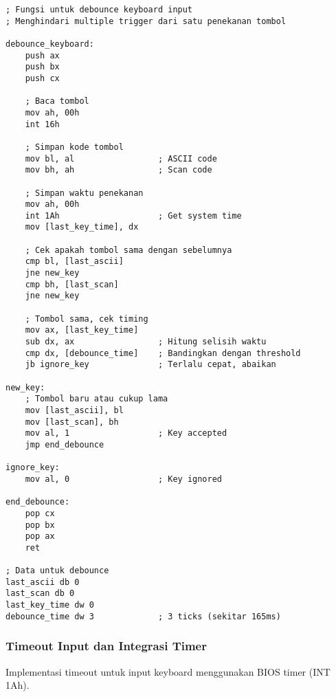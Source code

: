\documentclass[../main.tex]{subfiles}
\begin{document}
\begin{lstlisting}[language={[x86masm]Assembler}, caption=Debounce Implementation, label={lst:debounce}]
; Fungsi untuk debounce keyboard input
; Menghindari multiple trigger dari satu penekanan tombol

debounce_keyboard:
    push ax
    push bx
    push cx
    
    ; Baca tombol
    mov ah, 00h
    int 16h
    
    ; Simpan kode tombol
    mov bl, al                 ; ASCII code
    mov bh, ah                 ; Scan code
    
    ; Simpan waktu penekanan
    mov ah, 00h
    int 1Ah                    ; Get system time
    mov [last_key_time], dx
    
    ; Cek apakah tombol sama dengan sebelumnya
    cmp bl, [last_ascii]
    jne new_key
    cmp bh, [last_scan]
    jne new_key
    
    ; Tombol sama, cek timing
    mov ax, [last_key_time]
    sub dx, ax                 ; Hitung selisih waktu
    cmp dx, [debounce_time]    ; Bandingkan dengan threshold
    jb ignore_key              ; Terlalu cepat, abaikan
    
new_key:
    ; Tombol baru atau cukup lama
    mov [last_ascii], bl
    mov [last_scan], bh
    mov al, 1                  ; Key accepted
    jmp end_debounce
    
ignore_key:
    mov al, 0                  ; Key ignored
    
end_debounce:
    pop cx
    pop bx
    pop ax
    ret
    
; Data untuk debounce
last_ascii db 0
last_scan db 0
last_key_time dw 0
debounce_time dw 3             ; 3 ticks (sekitar 165ms)
\end{lstlisting}

\subsubsection{Timeout Input dan Integrasi Timer}
Implementasi timeout untuk input keyboard menggunakan BIOS timer (INT 1Ah).
\end{document}
